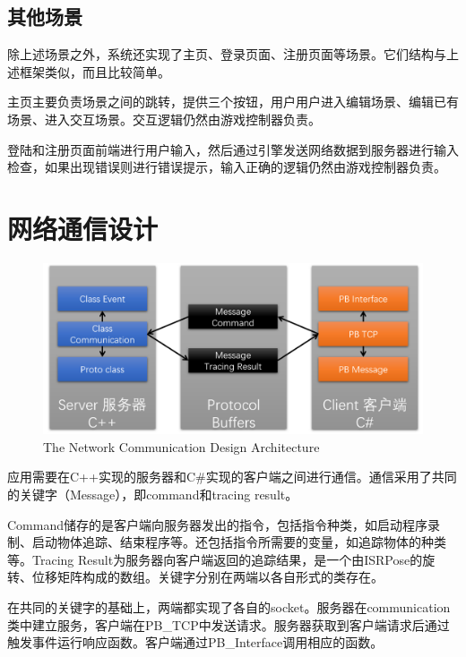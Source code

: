 \subsection{其他场景}
除上述场景之外，系统还实现了主页、登录页面、注册页面等场景。它们结构与上述框架类似，而且比较简单。

主页主要负责场景之间的跳转，提供三个按钮，用户用户进入编辑场景、编辑已有场景、进入交互场景。交互逻辑仍然由游戏控制器负责。

登陆和注册页面前端进行用户输入，然后通过引擎发送网络数据到服务器进行输入检查，如果出现错误则进行错误提示，输入正确的逻辑仍然由游戏控制器负责。

\section{网络通信设计}
\begin{figure}[!htp]
  \centering
  \includegraphics[width=12cm]{figure/netarc.png}
    {The Network Communication Design Architecture}
 \label{fig:gm}
\end{figure}
应用需要在C++实现的服务器和C\#实现的客户端之间进行通信。通信采用了共同的关键字（Message），即command和tracing result。

Command储存的是客户端向服务器发出的指令，包括指令种类，如启动程序录制、启动物体追踪、结束程序等。还包括指令所需要的变量，如追踪物体的种类等。Tracing Result为服务器向客户端返回的追踪结果，是一个由ISRPose的旋转、位移矩阵构成的数组。关键字分别在两端以各自形式的类存在。

在共同的关键字的基础上，两端都实现了各自的socket。服务器在communication类中建立服务，客户端在PB\_TCP中发送请求。服务器获取到客户端请求后通过触发事件运行响应函数。客户端通过PB\_Interface调用相应的函数。
